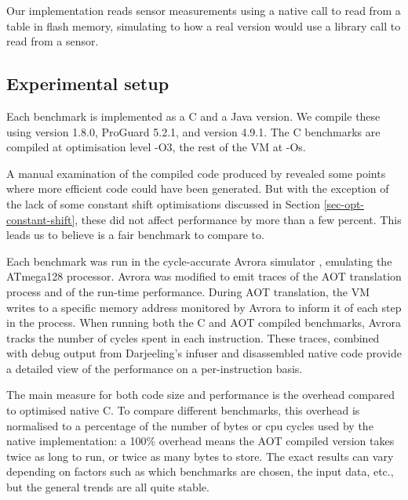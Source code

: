 Our implementation reads sensor measurements using a native call to read from a table in flash memory, simulating to how a real version would use a library call to read from a sensor.


\subsection{Experimental setup}
Each benchmark is implemented as a C and a Java version. We compile these using  version 1.8.0, ProGuard 5.2.1, and  version 4.9.1. The C benchmarks are compiled at optimisation level -O3, the rest of the VM at -Os.

A manual examination of the compiled code produced by  revealed some points where more efficient code could have been generated. But with the exception of the lack of some constant shift optimisations discussed in Section \ref{sec-opt-constant-shift}, these did not affect performance by more than a few percent. This leads us to believe  is a fair benchmark to compare to.

Each benchmark was run in the cycle-accurate Avrora simulator \cite{Titzer:2005vb}, emulating the ATmega128 processor. Avrora was modified to emit traces of the AOT translation process and of the run-time performance. During AOT translation, the VM writes to a specific memory address monitored by Avrora to inform it of each step in the process. When running both the C and AOT compiled benchmarks, Avrora tracks the number of cycles spent in each instruction. These traces, combined with debug output from Darjeeling's infuser and disassembled native code provide a detailed view of the performance on a per-instruction basis.

The main measure for both code size and performance is the overhead compared to optimised native C. To compare different benchmarks, this overhead is normalised to a percentage of the number of bytes or cpu cycles used by the native implementation: a 100\% overhead means the AOT compiled version takes twice as long to run, or twice as many bytes to store. The exact results can vary depending on factors such as which benchmarks are chosen, the input data, etc., but the general trends are all quite stable.
